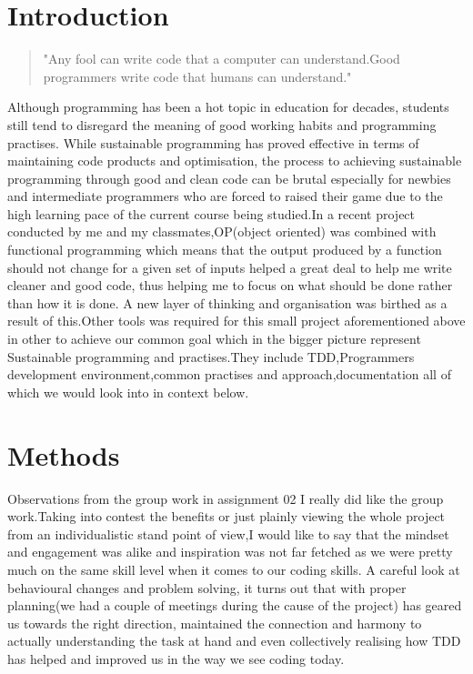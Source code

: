 \documentclass{article}
\begin{document}
{\section{Introduction}
\begin{quote}
    "Any fool can write code that a computer can understand.Good programmers write code that humans can understand."\cite{jayaraman_planning_nodate}
\end{quote}


Although programming has been a hot topic in education for decades, students  still tend to disregard the meaning of good working habits and programming practises. While sustainable programming has proved effective in terms of maintaining code products and optimisation, the process to achieving sustainable programming through good and clean code can be brutal especially for newbies and intermediate programmers who are forced to raised their game due to the high learning pace of the current course being studied.In a recent project conducted by me and my classmates,OP(object oriented)  was combined with functional programming which means that the output produced by a function should not change for a given set of inputs helped a great deal to help me write cleaner and good code, thus helping me to focus on what should be done rather than how  it is done. A new layer of thinking and organisation was birthed as a result of this.Other tools 
was required for this small project aforementioned above in other to achieve our common goal which in the bigger picture represent Sustainable programming and practises.They include TDD,Programmers  development environment,common practises and approach,documentation all of which we would look into in context below.

\newpage
\section{Methods}

Observations from the group work in assignment 02
I really did like the group work.Taking into contest the benefits or just plainly viewing the whole project from an individualistic stand point of view,I would like to say that the mindset and engagement was alike and inspiration was not far fetched as we were pretty much on the same skill level when it comes to our coding skills. A careful look at behavioural changes and problem solving, it turns out that with proper planning(we had a couple of meetings during the cause of the project) has geared us towards the right direction, maintained the connection and harmony to actually understanding the task at hand and even collectively  realising how TDD has helped and improved us in the way we see coding today.

}
\end{document}
